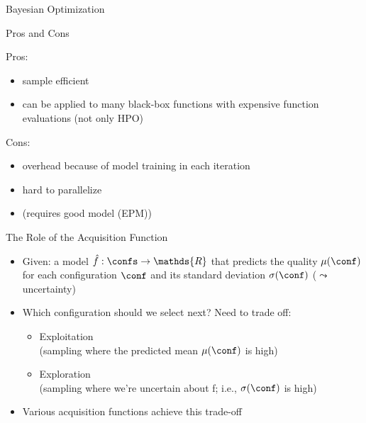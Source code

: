 \begin{frame}[c,fragile]{Bayesian Optimization}

\begin{block}{Pros and Cons}

Pros:
\begin{itemize}
  \item sample efficient
  \item can be applied to many black-box functions with expensive function evaluations (not only HPO)
\end{itemize}

Cons:
\begin{itemize}
  \item overhead because of model training in each iteration
  \item hard to parallelize
  \item (requires good model (EPM))
\end{itemize}

\end{block}

\end{frame}


\begin{frame}[c,fragile]{The Role of the Acquisition Function}
\begin{itemize}
  \item Given: a model $\hat{f}:\confs \rightarrow \mathds{R}$ that predicts the quality $\mu(\conf)$ for each configuration $\conf$ and its standard deviation $\sigma(\conf)$ ($\leadsto$ uncertainty)
  \medskip
  \mypause
  \item Which configuration should we select next? Need to trade off: 
  \begin{itemize}
    \item \alert{Exploitation}\\(sampling where the predicted mean $\mu(\conf)$ is high)
    \item \alert{Exploration}\\(sampling where we're uncertain about f; i.e., $\sigma(\conf)$ is high)
  \end{itemize}
  \medskip
  \mypause
  \item Various acquisition functions achieve this trade-off
\end{itemize}

\end{frame}


